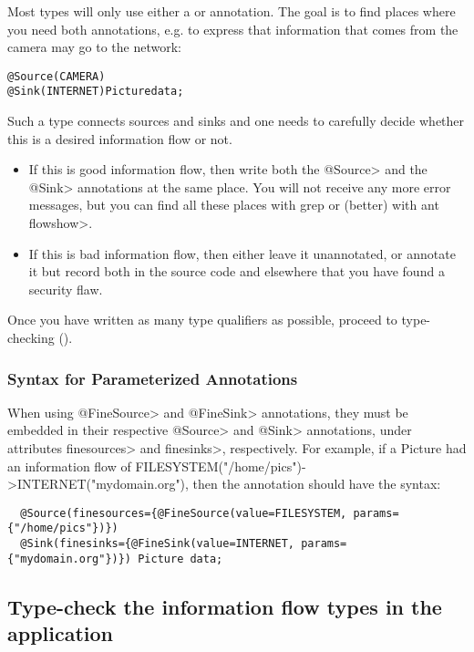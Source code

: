 Most types will only use either a \srcsome or \sinksome
annotation.
The goal is to find places where you need both annotations, e.g. to
express that information that comes from the camera may go to the
network:

\begin{alltt}
    @Source(CAMERA)
    @Sink(INTERNET) Picture data;
\end{alltt}

Such a type connects sources and sinks and one needs to carefully
decide whether this is a desired information flow or not.
\begin{itemize}
\item If this is good information flow, then write both the \<@Source>
  and the \<@Sink> annotations at the same place. You will not
  receive any more error messages, but you can find all these places
  with grep or (better) with \<ant flowshow>.
\item If this is bad information flow, then either leave it unannotated,
  or annotate it but record both in the source code and elsewhere that
  you have found a security flaw.
\end{itemize}


Once you have written as many type qualifiers as possible, proceed to
type-checking ().

\subsubsection{Syntax for Parameterized Annotations\label{sec:parameterized-syntax}}
When using \<@FineSource> and \<@FineSink> annotations, they must be embedded in their
respective \<@Source> and \<@Sink> annotations, under attributes \<finesources> and \<finesinks>, respectively.
For example, if a Picture had an information flow of FILESYSTEM("/home/pics")->INTERNET("mydomain.org"),
then the annotation should have the syntax:

\begin{Verbatim}
  @Source(finesources={@FineSource(value=FILESYSTEM, params={"/home/pics"})})
  @Sink(finesinks={@FineSink(value=INTERNET, params={"mydomain.org"})}) Picture data;
\end{Verbatim}

\subsection{Type-check the information flow types in the application\label{sec:run-type-checker}}

